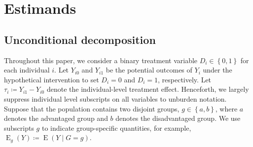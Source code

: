 \documentclass[12pt,a4paper]{article}
\newcommand{\E}{\operatorname{E}}
\begin{document}


\section{Estimands}
\subsection{Unconditional decomposition}
Throughout this paper, we consider a binary treatment variable $D_i \in \left\lbrace 0,1 \right\rbrace$ for each individual $i$. Let $Y_{i0}$ and $Y_{i1}$ be the potential outcomes \citep{rubin_estimating_1974} of $Y_i$ under the hypothetical intervention to set $D_i=0$ and $D_i=1$, respectively. Let $\tau_i \coloneqq Y_{i1} - Y_{i0}$ denote the individual-level treatment effect. Henceforth, we largely suppress individual level subscripts on all variables to unburden notation. Suppose that the population contains two disjoint groups, $g \in \left\lbrace a,b \right\rbrace$, where $a$ denotes the advantaged group and $b$ denotes the disadvantaged group. We use subscripts $g$ to indicate group-specific quantities, for example, $\E_g(Y) \coloneqq \E(Y \mid G=g)$.  
\end{document}
